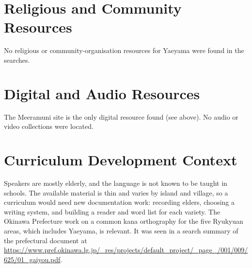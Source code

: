 \documentclass[12pt]{article}
\begin{document}
\section{Religious and Community Resources}
No religious or community-organisation resources for Yaeyama were found in the searches.

\section{Digital and Audio Resources}
The Meeramuni site is the only digital resource found (see above). No audio or video collections were located.

\section{Curriculum Development Context}
Speakers are mostly elderly, and the language is not known to be taught in schools. The available material is thin and varies by island and village, so a curriculum would need new documentation work: recording elders, choosing a writing system, and building a reader and word list for each variety. The Okinawa Prefecture work on a common kana orthography for the five Ryukyuan areas, which includes Yaeyama, is relevant. It was seen in a search summary of the prefectural document at \url{https://www.pref.okinawa.lg.jp/_res/projects/default_project/_page_/001/009/625/01_gaiyou.pdf}.
\end{document}
